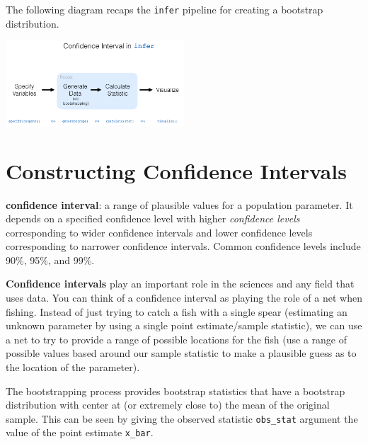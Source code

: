 \documentclass[]{article}
\newenvironment{Shaded}{\begin{snugshade}}{\end{snugshade}}
\newcommand{\KeywordTok}[1]{\textcolor[rgb]{0.13,0.29,0.53}{\textbf{#1}}}
\newcommand{\DataTypeTok}[1]{\textcolor[rgb]{0.13,0.29,0.53}{#1}}
\newcommand{\StringTok}[1]{\textcolor[rgb]{0.31,0.60,0.02}{#1}}
\newcommand{\OperatorTok}[1]{\textcolor[rgb]{0.81,0.36,0.00}{\textbf{#1}}}
\newcommand{\NormalTok}[1]{#1}
\begin{document}
The following diagram recaps the \texttt{infer} pipeline for creating a
bootstrap distribution.

\begin{center}
\includegraphics[width=0.5\textwidth]{ci_diagram.png}
\end{center}

\section{Constructing Confidence Intervals}\label{sec:CI}

\textbf{confidence interval}: a range of plausible values for a
population parameter. It depends on a specified confidence level with
higher \emph{confidence levels} corresponding to wider confidence
intervals and lower confidence levels corresponding to narrower
confidence intervals. Common confidence levels include 90\%, 95\%, and
99\%.

\textbf{Confidence intervals} play an important role in the sciences and
any field that uses data. You can think of a confidence interval as
playing the role of a net when fishing. Instead of just trying to catch
a fish with a single spear (estimating an unknown parameter by using a
single point estimate/sample statistic), we can use a net to try to
provide a range of possible locations for the fish (use a range of
possible values based around our sample statistic to make a plausible
guess as to the location of the parameter).

The bootstrapping process provides bootstrap statistics that have a
bootstrap distribution with center at (or extremely close to) the mean
of the original sample. This can be seen by giving the observed
statistic \texttt{obs\_stat} argument the value of the point estimate
\texttt{x\_bar}.

\begin{Shaded}
\end{Shaded}
\end{document}
